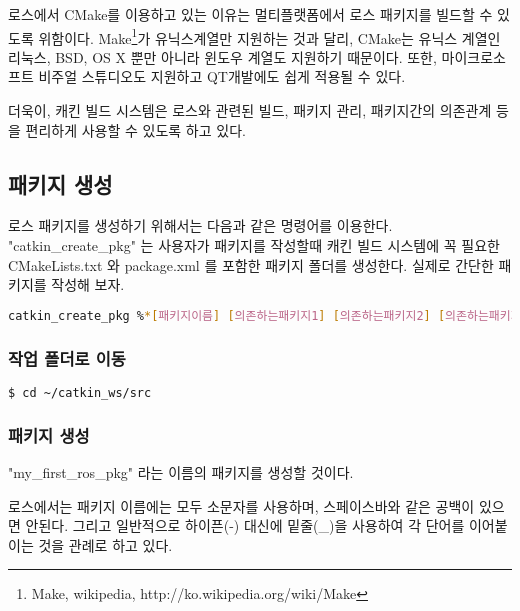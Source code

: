 로스에서 CMake를 이용하고 있는 이유는 멀티플랫폼에서 로스 패키지를 빌드할 수 있도록 위함이다. Make\footnote{Make, wikipedia, http://ko.wikipedia.org/wiki/Make}가 유닉스계열만 지원하는 것과 달리, CMake는 유닉스 계열인 리눅스, BSD, OS X 뿐만 아니라 윈도우 계열도 지원하기 때문이다. 또한, 마이크로소프트 비주얼 스튜디오도 지원하고 QT개발에도 쉽게 적용될 수 있다. 

더욱이, 캐킨 빌드 시스템은 로스와 관련된 빌드, 패키지 관리, 패키지간의 의존관계 등을 편리하게 사용할 수 있도록 하고 있다. 

\subsection{패키지 생성}

로스 패키지를 생성하기 위해서는 다음과 같은 명령어를 이용한다. "catkin\_create\_pkg" 는 사용자가 패키지를 작성할때 캐킨 빌드 시스템에 꼭 필요한 CMakeLists.txt 와 package.xml 를 포함한 패키지 폴더를 생성한다. 실제로 간단한 패키지를 작성해 보자.

\begin{lstlisting}[language=bash]
catkin_create_pkg %*[패키지이름] [의존하는패키지1] [의존하는패키지2] [의존하는패키지3]*)
\end{lstlisting}

\subsubsection{작업 폴더로 이동}

\begin{lstlisting}[language=bash]
$ cd ~/catkin_ws/src
\end{lstlisting}

\subsubsection{패키지 생성}

"my\_first\_ros\_pkg" 라는 이름의 패키지를 생성할 것이다. 

로스에서는 패키지 이름에는 모두 소문자를 사용하며, 스페이스바와 같은 공백이 있으면 안된다. 그리고 일반적으로 하이픈(-) 대신에 밑줄(\_)을 사용하여 각 단어를 이어붙이는 것을 관례로 하고 있다. 

